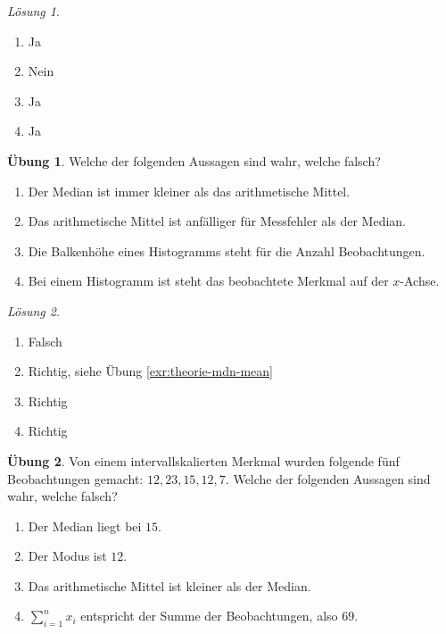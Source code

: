 \documentclass[
]{book}
\providecommand{\tightlist}{%
  \setlength{\itemsep}{0pt}\setlength{\parskip}{0pt}}
\theoremstyle{definition}
\theoremstyle{definition}
\theoremstyle{definition}
\newtheorem{exercise}{Übung}[chapter]
\theoremstyle{definition}
\theoremstyle{remark}
\newtheorem*{solution}{Lösung}
\begin{document}
\begin{solution}
\leavevmode

\begin{enumerate}
\def\labelenumi{\alph{enumi})}
\tightlist
\item
  Ja
\item
  Nein
\item
  Ja
\item
  Ja
\end{enumerate}

\end{solution}

\begin{exercise}
\leavevmode

Welche der folgenden Aussagen sind wahr, welche falsch?

\begin{enumerate}
\def\labelenumi{\alph{enumi})}
\tightlist
\item
  Der Median ist immer kleiner als das arithmetische Mittel.
\item
  Das arithmetische Mittel ist anfälliger für Messfehler als der Median.
\item
  Die Balkenhöhe eines Histogramms steht für die Anzahl Beobachtungen.
\item
  Bei einem Histogramm ist steht das beobachtete Merkmal auf der \(x\)-Achse.
\end{enumerate}

\end{exercise}

\begin{solution}
\leavevmode

\begin{enumerate}
\def\labelenumi{\alph{enumi})}
\tightlist
\item
  Falsch
\item
  Richtig, siehe Übung \ref{exr:theorie-mdn-mean}
\item
  Richtig
\item
  Richtig
\end{enumerate}

\end{solution}

\begin{exercise}
\leavevmode

Von einem intervallskalierten Merkmal wurden folgende fünf Beobachtungen gemacht: \(12, 23, 15, 12, 7\). Welche der folgenden Aussagen sind wahr, welche falsch?

\begin{enumerate}
\def\labelenumi{\alph{enumi})}
\tightlist
\item
  Der Median liegt bei \(15\).
\item
  Der Modus ist \(12\).
\item
  Das arithmetische Mittel ist kleiner als der Median.
\item
  \(\sum_{i = 1}^n x_i\) entspricht der Summe der Beobachtungen, also \(69\).
\end{enumerate}

\end{exercise}
\end{document}

